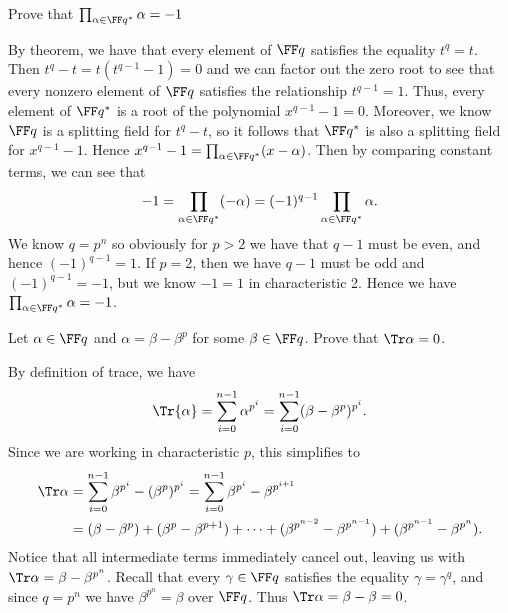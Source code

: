 \documentclass{article}
\begin{document}
\begin{exercise} %
  Prove that \( \prod_{\alpha\in \FF q^*} \alpha = -1 \)
\end{exercise}
\begin{solution}
By theorem, we have that every element of \( \FF q \) satisfies the equality \( t^q = t \).
Then \( t^q-t = t(t^{q-1}-1) = 0 \) and we can factor out the zero root to see that every nonzero element of \( \FF q \) satisfies the relationship \( t^{q-1} = 1 \).
Thus, every element of \( \FF q^* \) is a root of the polynomial \( x^{q-1}-1 = 0 \).
Moreover, we know \( \FF q \) is a splitting field for \( t^q-t \), so it follows that \( \FF q^* \) is also a splitting field for \( x^{q-1}-1 \).
Hence \( x^{q-1}-1 = \prod_{\alpha\in \FF q^*} (x-\alpha) \).
Then by comparing constant terms, we can see that \begin{align*}
  -1 = \prod_{\alpha\in \FF q^*} (-\alpha) = (-1)^{q-1}\prod_{\alpha\in \FF q^*} \alpha.
\end{align*}
We know \( q = p^n \) so obviously for \( p > 2 \) we have that \( q-1 \) must be even, and hence \( (-1)^{q-1}=1 \).
If \( p = 2 \), then we have \( q-1 \) must be odd and \( (-1)^{q-1} = -1 \), but we know \( -1 = 1 \) in characteristic 2.
Hence we have \( \prod_{\alpha\in \FF q^*} \alpha = -1 \).
\end{solution}

\begin{subexercise} %
  Let \( \alpha\in\FF q \) and \( \alpha=\beta-\beta^p \) for some \( \beta\in\FF q \).
  Prove that \( \Tr \alpha = 0 \).
\end{subexercise}
\begin{solution}
By definition of trace, we have \begin{align*}
  \Tr{\alpha} = \sum_{i=0}^{n-1} \alpha^{p^i} = \sum_{i=0}^{n-1}(\beta-\beta^p)^{p^i}.
\end{align*}
Since we are working in characteristic \( p \), this simplifies to \begin{align*}
  \Tr \alpha &= \sum_{i=0}^{n-1}\beta^{p^i}-(\beta^p)^{p^i} = \sum_{i=0}^{n-1}\beta^{p^i}-\beta^{p^{i+1}} \\
  &= (\beta-\beta^p) + (\beta^p - \beta^{p+1}) + \cdots + (\beta^{p^{n-2}}-\beta^{p^{n-1}}) + (\beta^{p^{n-1}}-\beta^{p^n}).
\end{align*}
Notice that all intermediate terms immediately cancel out, leaving us with \( \Tr \alpha = \beta - \beta^{p^n} \).
Recall that every \( \gamma\in \FF q \) satisfies the equality \( \gamma=\gamma^q \), and since \( q=p^n \) we have \( \beta^{p^n} = \beta \) over \( \FF q \).
Thus \( \Tr \alpha = \beta-\beta = 0 \).
\end{solution}
\end{document}

